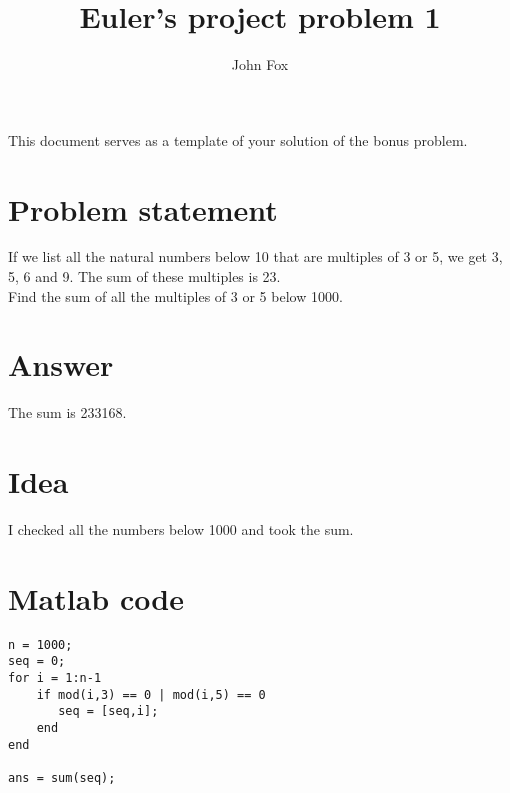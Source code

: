 \documentclass{article}
\title{Euler's project problem 1}
\author{John Fox}
\begin{document}
\maketitle
\large
This document serves as a template of your solution of the bonus problem.\\

\section*{Problem statement} 
If we list all the natural numbers below 10 that are multiples of 3 or 5, we get 3, 5, 6 and 9. The sum of these multiples is 23.\\

Find the sum of all the multiples of 3 or 5 below 1000.

\section*{Answer}
The sum is 233168.
\section*{Idea} I checked all the numbers below 1000 and took the sum.

\section*{Matlab code}
\begin{verbatim}
n = 1000;
seq = 0;
for i = 1:n-1
    if mod(i,3) == 0 | mod(i,5) == 0
       seq = [seq,i];
    end
end

ans = sum(seq);
\end{verbatim}
\end{document}
